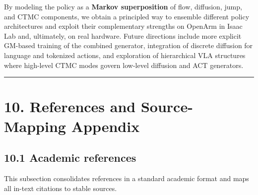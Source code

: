\documentclass[
]{article}
\theoremstyle{remark}
\begin{document}
By modeling the policy as a \textbf{Markov superposition} of flow,
diffusion, jump, and CTMC components, we obtain a principled way to
ensemble different policy architectures and exploit their complementary
strengths on OpenArm in Isaac Lab and, ultimately, on real hardware.
Future directions include more explicit GM-based training of the
combined generator, integration of discrete diffusion for language and
tokenized actions, and exploration of hierarchical VLA structures where
high-level CTMC modes govern low-level diffusion and ACT
generators. \cite{isaaclab-github,act-openarm-notes,gm2025}

\begin{center}\rule{0.5\linewidth}{0.5pt}\end{center}

\section{10. References and Source-Mapping Appendix}\label{references-and-source-mapping}

\subsection{10.1 Academic references}\label{academic-references}

This subsection consolidates references in a standard academic format and maps all in-text citations to stable sources.
\end{document}
